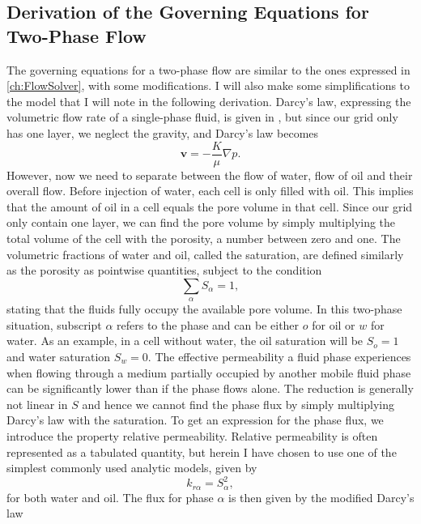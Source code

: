 \subsection{Derivation of the Governing Equations for Two-Phase Flow}
The governing equations for a two-phase flow are similar to the ones expressed in \autoref{ch:FlowSolver}, with some modifications. I will also make some simplifications to the model that I will note in the following derivation. Darcy's law, expressing the volumetric flow rate of a single-phase fluid, is given in , but since our grid only has one layer, we neglect the gravity, and Darcy's law becomes
\begin{equation*}
    \textbf{v} = - \frac{K}{\mu}\nabla p.
    \label{eq:DarcyNoGravity}
\end{equation*}
However, now we need to separate between the flow of water, flow of oil and their overall flow. Before injection of water, each cell is only filled with oil. This implies that the amount of oil in a cell equals the pore volume in that cell. Since our grid only contain one layer, we can find the pore volume by simply multiplying the total volume of the cell with the porosity, a number between zero and one. The volumetric fractions of water and oil, called the saturation, are defined similarly as the porosity as pointwise quantities, subject to the condition
\begin{equation*}
\sum_\alpha S_\alpha = 1,
\end{equation*}
stating that the fluids fully occupy the available pore volume. In this two-phase situation, subscript $\alpha$ refers to the phase and can be either $o$ for oil or $w$ for water. As an example, in a cell without water, the oil saturation will be $S_o = 1$ and water saturation $S_w = 0$.  The effective permeability a fluid phase experiences when flowing through a medium partially occupied by another mobile fluid phase can be significantly lower than if the phase flows alone. The reduction is generally not linear in $S$ and hence we cannot find the phase flux by simply multiplying Darcy's law with the saturation. To get an expression for the phase flux, we introduce the property relative permeability. Relative permeability is often represented as a tabulated quantity, but herein I have chosen to use one of the simplest commonly used analytic models, given by
\begin{equation*}
k_{r\alpha} = S_\alpha^2,
\end{equation*}
for both water and oil. The flux for phase $\alpha$ is then given by the modified Darcy's law

